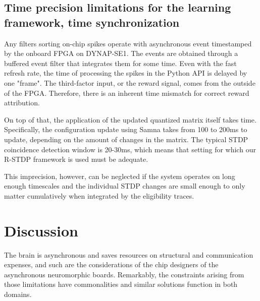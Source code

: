 






\subsection{Time precision limitations for the learning framework, time synchronization}


Any filters sorting on-chip spikes operate with asynchronous event timestamped by the onboard FPGA on DYNAP-SE1. The events are obtained through a buffered event filter that integrates them for some time. Even with the fast refresh rate, the time of processing the spikes in the Python API is delayed by one "frame". The third-factor input, or the reward signal, comes from the outside of the FPGA. Therefore, there is an inherent time mismatch for correct reward attribution.

On top of that, the application of the updated quantized matrix itself takes time. Specifically, the configuration update using Samna takes from 100 to 200ms to update, depending on the amount of changes in the matrix. The typical STDP coincidence detection window is 20-30ms, which means that setting for which our R-STDP framework is used must be adequate.

This imprecision, however, can be neglected if the system operates on long enough timescales and the individual STDP changes are small enough to only matter cumulatively when integrated by the eligibility traces.


\section{Discussion}

The brain is asynchronous and saves resources on structural and communication expenses, and such are the considerations of the chip designers of the asynchronous neuromorphic boards. Remarkably, the constraints arising from those limitations have commonalities and similar solutions function in both domains.

